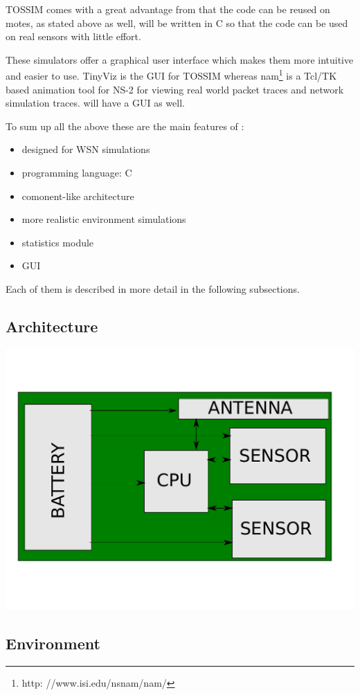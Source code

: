 TOSSIM comes with a great advantage from that the code can be reused on motes,
as stated above as well, \codename will be written in C so that the code can be
used on real sensors with little effort.   

These simulators offer a graphical user interface which makes them more intuitive
and easier to use. TinyViz is the GUI for TOSSIM whereas nam\footnote{http:
//www.isi.edu/nsnam/nam/} is a Tcl/TK based
animation tool for NS-2 for viewing real world packet traces and network simulation
traces. \codename will have a GUI as well.

To sum up all the above these are the main features of \codename:
\begin{itemize}
\item designed for WSN simulations
\item programming language: C
\item comonent-like architecture
\item more realistic environment simulations
\item statistics module
\item GUI
\end{itemize} 
Each of them is described in more detail in the following subsections.

\subsection{Architecture}
\begin{center}
	\includegraphics[scale=0.6]{img/board.pdf}
\end{center}

\subsection{Environment}


